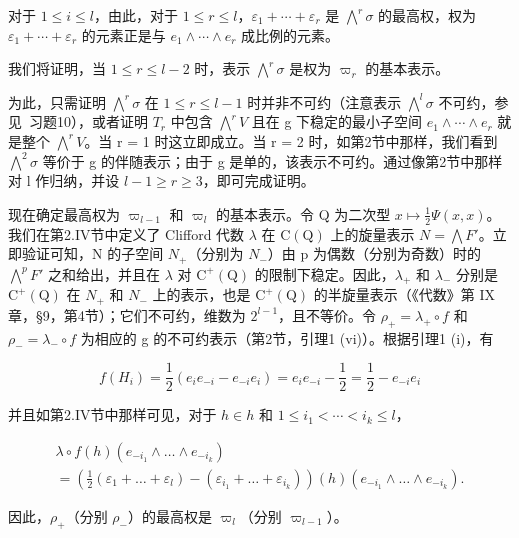 对于 \(1 \leq i \leq l\)，由此，对于 \(1 \leq r \leq l\)，\(\varepsilon_{1} + \cdots + \varepsilon_{r}\) 是 \(\bigwedge^{r} \sigma\) 的最高权，权为 \(\varepsilon_{1} + \cdots + \varepsilon_{r}\) 的元素正是与 \(e_{1} \wedge \cdots \wedge e_{r}\) 成比例的元素。

我们将证明，当 \(1 \leq r \leq l - 2\) 时，表示 \(\bigwedge^{r} \sigma\) 是权为 \(\varpi_{r}\) 的基本表示。

为此，只需证明 \(\bigwedge^{r}\sigma\) 在 \(1 \leq r \leq l - 1\) 时并非不可约（注意表示 \(\bigwedge^{l}\sigma\) 不可约，参见~习题10），或者证明 \(T_{r}\) 中包含 \(\bigwedge^{r}V\) 且在 g 下稳定的最小子空间 \(e_{1} \wedge \cdots \wedge e_{r}\) 就是整个 \(\bigwedge^{r}V\)。当 r = 1 时这立即成立。当 r = 2 时，如第2节中那样，我们看到 \(\bigwedge^{2}\sigma\) 等价于 g 的伴随表示；由于 g 是单的，该表示不可约。通过像第2节中那样对 l 作归纳，并设 \(l - 1 \geq r \geq 3\)，即可完成证明。

现在确定最高权为 \(\varpi_{l-1}\) 和 \(\varpi_{l}\) 的基本表示。令 Q 为二次型 \(x \mapsto \frac{1}{2}\Psi(x, x)\)。我们在第2.IV节中定义了 Clifford 代数 \(\lambda\) 在 \(\mathrm{C}(\mathrm{Q})\) 上的旋量表示 \(N = \bigwedge F'\)。立即验证可知，N 的子空间 \(N_{+}\)（分别为 \(N_{-}\)）由 p 为偶数（分别为奇数）时的 \(\bigwedge^{p}F'\) 之和给出，并且在 \(\lambda\) 对 \(\mathrm{C}^{+}(\mathrm{Q})\) 的限制下稳定。因此，\(\lambda_{+}\) 和 \(\lambda_{-}\) 分别是 \(\mathrm{C}^{+}(\mathrm{Q})\) 在 \(N_{+}\) 和 \(N_{-}\) 上的表示，也是 \(\mathrm{C}^{+}(\mathrm{Q})\) 的半旋量表示（《代数》第 IX 章，§9，第4节）；它们不可约，维数为 \(2^{l-1}\)，且不等价。令 \(\rho_{+} = \lambda_{+} \circ f\) 和 \(\rho_{-} = \lambda_{-} \circ f\) 为相应的 g 的不可约表示（第2节，引理1 (vi)）。根据引理1 (i)，有

\[
f (H _ {i}) = \frac {1}{2} (e _ {i} e _ {- i} - e _ {- i} e _ {i}) = e _ {i} e _ {- i} - \frac {1}{2} = \frac {1}{2} - e _ {- i} e _ {i}
\]

并且如第2.IV节中那样可见，对于 \(h \in h\) 和 \(1 \leq i_{1} < \cdots < i_{k} \leq l\)，

\[
\begin{array}{l} \lambda \circ f (h) (e _ {- i _ {1}} \wedge \dots \wedge e _ {- i _ {k}}) \\ = (\frac {1}{2} (\varepsilon_ {1} + \dots + \varepsilon_ {l}) - (\varepsilon_ {i _ {1}} + \dots + \varepsilon_ {i _ {k}})) (h) (e _ {- i _ {1}} \wedge \dots \wedge e _ {- i _ {k}}). \end{array}
\]

因此，\(\rho_{+}\)（分别 \(\rho_{-}\)）的最高权是 \(\varpi_{l}\)（分别 \(\varpi_{l-1}\)）。


